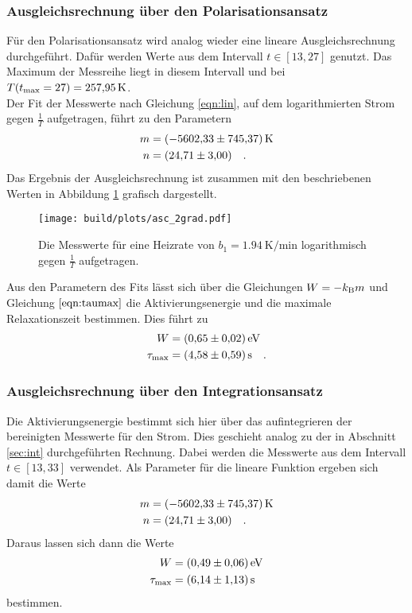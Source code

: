 \subsubsection{Ausgleichsrechnung über den Polarisationsansatz}

\noindent
Für den Polarisationsansatz wird analog wieder eine lineare Ausgleichsrechnung durchgeführt.
Dafür werden Werte aus dem Intervall $t \in [13,27]$ genutzt.
Das Maximum der Messreihe liegt in diesem Intervall und bei $T(t_\t{max} = 27) = \SI{257.95}{\kelvin}$. \\
Der Fit der Messwerte nach Gleichung \ref{eqn:lin}, auf dem logarithmierten Strom gegen $\frac{1}{T}$ aufgetragen, führt zu den Parametern
\begin{align*}
  m & = \SI{ -5602.33( 74537)}{\kelvin}\\
  n & = \SI{24.71(300)}{} \quad .
\end{align*}
Das Ergebnis der Ausgleichsrechnung ist zusammen mit den beschriebenen Werten in Abbildung \ref{img:pol2} grafisch dargestellt.

\begin{figure}[ht]
  \centering
  \texttt{[image: build/plots/asc\_2grad.pdf]}
  \caption{Die Messwerte für eine Heizrate von $b_1 = \SI{1.94}{\kelvin\per\minute}$ 
          logarithmisch gegen $\frac{1}{T}$ aufgetragen.}
  \label{img:pol2}
\end{figure}

\noindent
Aus den Parametern des Fits lässt sich über die Gleichungen $W = -k_\t{B} m$ und Gleichung $\ref{eqn:taumax}$ die Aktivierungsenergie und die maximale Relaxationszeit bestimmen.
Dies führt zu 
\begin{align*}
  W &= \SI{0.65 (002)}{\electronvolt}\\
  \tau_\t{max} &= \SI{4.58 (059)}{\second} \quad .
\end{align*}



\subsubsection{Ausgleichsrechnung über den Integrationsansatz}

\noindent
Die Aktivierungsenergie bestimmt sich hier über das aufintegrieren der bereinigten Messwerte für den Strom. 
Dies geschieht analog zu der in Abschnitt \ref{sec:int} durchgeführten Rechnung.
Dabei werden die Messwerte aus dem Intervall  $t \in [13,33]$ verwendet.
Als Parameter für die lineare Funktion ergeben sich damit die Werte
\begin{align*}
  m & = \SI{  -5602.33 (74537)}{\kelvin}\\
  n & = \SI{24.71 (300)}{} \quad .
\end{align*}
Daraus lassen sich dann die Werte 
\begin{align*}
  W &= \SI{ 0.49  (006)}{\electronvolt}\\
  \tau_\t{max} &= \SI{6.14 (113)}{\second}
\end{align*}
bestimmen.





